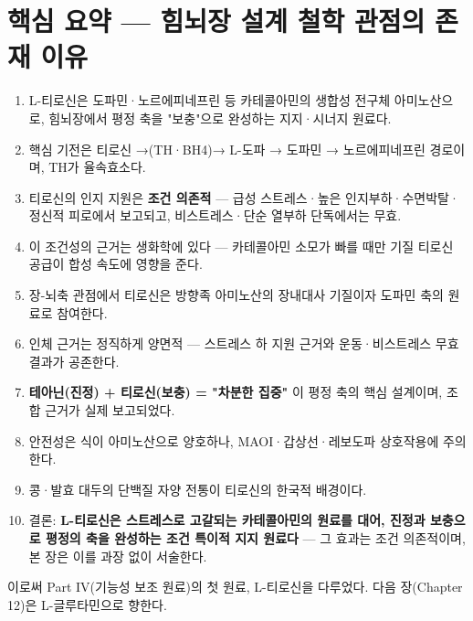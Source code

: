 \documentclass[11pt,oneside]{book}
\begin{document}
\section{핵심 요약 — 힘뇌장 설계 철학 관점의 존재 이유}
\begin{enumerate}[leftmargin=6mm,itemsep=1pt,topsep=2pt]
  \item L-티로신은 도파민·노르에피네프린 등 카테콜아민의 생합성 전구체 아미노산으로, 힘뇌장에서 평정 축을 "보충"으로 완성하는 지지·시너지 원료다.
  \item 핵심 기전은 티로신 →(TH·BH4)→ L-도파 → 도파민 → 노르에피네프린 경로이며, TH가 율속효소다.
  \item 티로신의 인지 지원은 \textbf{조건 의존적} — 급성 스트레스·높은 인지부하·수면박탈·정신적 피로에서 보고되고, 비스트레스·단순 열부하 단독에서는 무효.
  \item 이 조건성의 근거는 생화학에 있다 — 카테콜아민 소모가 빠를 때만 기질 티로신 공급이 합성 속도에 영향을 준다.
  \item 장-뇌축 관점에서 티로신은 방향족 아미노산의 장내대사 기질이자 도파민 축의 원료로 참여한다.
  \item 인체 근거는 정직하게 양면적 — 스트레스 하 지원 근거와 운동·비스트레스 무효 결과가 공존한다.
  \item \textbf{테아닌(진정) + 티로신(보충) = "차분한 집중"} 이 평정 축의 핵심 설계이며, 조합 근거가 실제 보고되었다.
  \item 안전성은 식이 아미노산으로 양호하나, MAOI·갑상선·레보도파 상호작용에 주의한다.
  \item 콩·발효 대두의 단백질 자양 전통이 티로신의 한국적 배경이다.
  \item 결론: \textbf{L-티로신은 스트레스로 고갈되는 카테콜아민의 원료를 대어, 진정과 보충으로 평정의 축을 완성하는 조건 특이적 지지 원료다} — 그 효과는 조건 의존적이며, 본 장은 이를 과장 없이 서술한다.
\end{enumerate}
이로써 Part IV(기능성 보조 원료)의 첫 원료, L-티로신을 다루었다. 다음 장(Chapter 12)은 L-글루타민으로 향한다.
\end{document}
